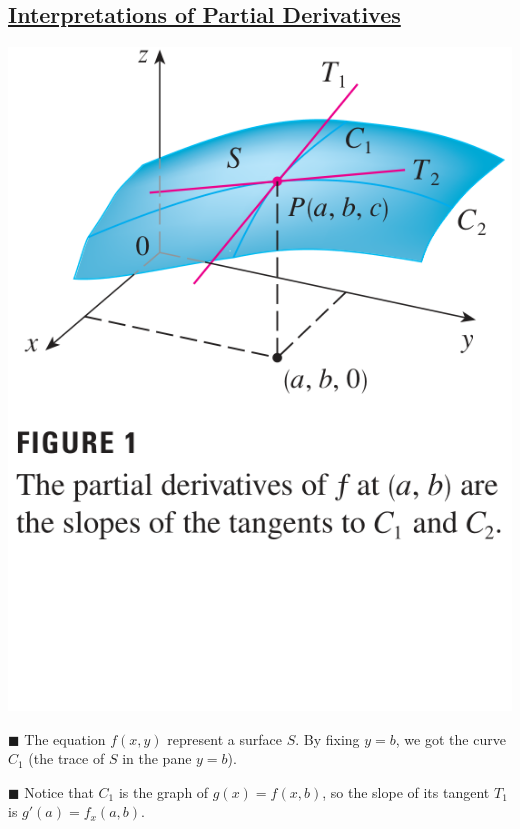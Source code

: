 \documentclass{article}
\begin{document}
\subsection*{{\selectfont \underline{Interpretations of Partial Derivatives}}}

\begin{minipage}[]{0.34\linewidth}
  \begin{center}
    \includegraphics[width = 4.3 cm]{./images/interpretation.png} 
  \end{center}
\end{minipage}
\begin{minipage}[]{0.6\linewidth}
\textcolor{blue5}{\small $\blacksquare$}  The equation $f(x,y)$ represent a surface $S$. By fixing $y = b$, we got the curve $C_1$ (the trace of $S$ in the pane $y = b $).

\textcolor{blue5}{\small $\blacksquare$}  Notice that $C_1 $ is the graph of $g(x) = f(x, b )$, so the slope of its tangent $T_1$ is $g'(a) = f_x(a,b)$.
\end{minipage}
\end{document}
